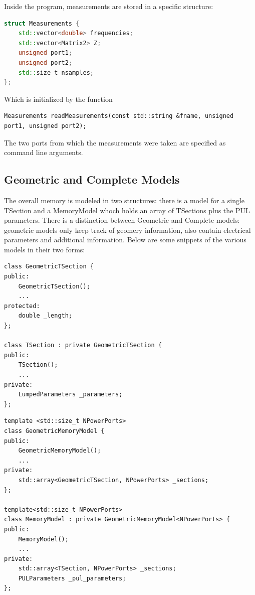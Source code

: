 Inside the program, measurements are stored in a specific structure:
\begin{lstlisting}[language=C++]
struct Measurements {
    std::vector<double> frequencies;
    std::vector<Matrix2> Z;
    unsigned port1;
    unsigned port2;
    std::size_t nsamples;
};
\end{lstlisting}
Which is initialized by the function
\begin{lstlisting}
Measurements readMeasurements(const std::string &fname, unsigned port1, unsigned port2);
\end{lstlisting}
The two ports from which the measurements were taken are specified as command line arguments.

\subsection{Geometric and Complete Models}
The overall memory is modeled in two structures: there is a model for a single TSection and a MemoryModel whoch holds an array of TSections plus the PUL parameters. There is a distinction between Geometric and Complete models: geometric models only keep track of geomery information, also contain electrical parameters and additional information. Below are some snippets of the various models in their two forms:

\begin{lstlisting}[title=Snippets for Geometric and Complete TSection]
class GeometricTSection {
public:
    GeometricTSection();
    ...
protected:
    double _length;
};

class TSection : private GeometricTSection {
public:
    TSection();
    ...
private:
    LumpedParameters _parameters;
};
\end{lstlisting}

\begin{lstlisting}[title=Snippets for Geometric and Complete MemoryModel]
template <std::size_t NPowerPorts>
class GeometricMemoryModel {
public:
    GeometricMemoryModel();
    ...
private:
    std::array<GeometricTSection, NPowerPorts> _sections;
};

template<std::size_t NPowerPorts>
class MemoryModel : private GeometricMemoryModel<NPowerPorts> {
public:
    MemoryModel();
    ...
private:
    std::array<TSection, NPowerPorts> _sections;
    PULParameters _pul_parameters;
};
\end{lstlisting}

